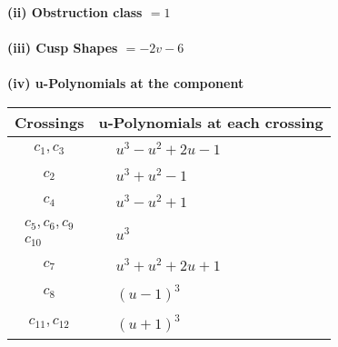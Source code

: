 \documentclass[1p]{elsarticle_modified}
\theoremstyle{definition}
\begin{document}
\flushleft \textbf{(ii) Obstruction class $= 1$}\\~\\
\flushleft \textbf{(iii) Cusp Shapes $= -2 v-6$}\\~\\
\newpage\renewcommand{\arraystretch}{1}
\flushleft \textbf{(iv) u-Polynomials at the component}\newline \\
\begin{tabular}{m{50pt}|m{274pt}}
Crossings & \hspace{64pt}u-Polynomials at each crossing \\
\hline $$\begin{aligned}c_{1},c_{3}\end{aligned}$$&$\begin{aligned}
&u^3- u^2+2 u-1
\end{aligned}$\\
\hline $$\begin{aligned}c_{2}\end{aligned}$$&$\begin{aligned}
&u^3+u^2-1
\end{aligned}$\\
\hline $$\begin{aligned}c_{4}\end{aligned}$$&$\begin{aligned}
&u^3- u^2+1
\end{aligned}$\\
\hline $$\begin{aligned}c_{5},c_{6},c_{9}\\c_{10}\end{aligned}$$&$\begin{aligned}
&u^3
\end{aligned}$\\
\hline $$\begin{aligned}c_{7}\end{aligned}$$&$\begin{aligned}
&u^3+u^2+2 u+1
\end{aligned}$\\
\hline $$\begin{aligned}c_{8}\end{aligned}$$&$\begin{aligned}
&(u-1)^3
\end{aligned}$\\
\hline $$\begin{aligned}c_{11},c_{12}\end{aligned}$$&$\begin{aligned}
&(u+1)^3
\end{aligned}$\\
\hline
\end{tabular}\\~\\
\end{document}
